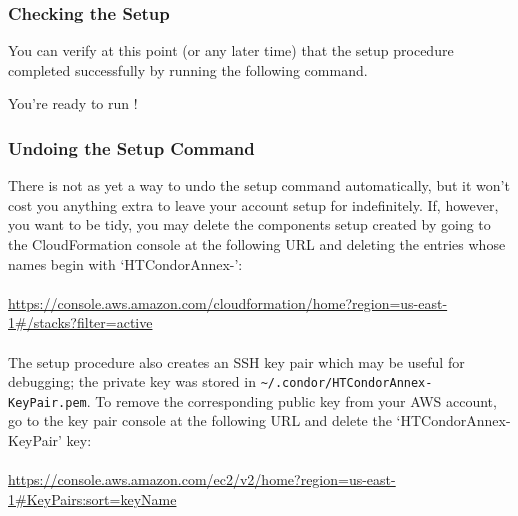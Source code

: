 \subsubsection{Checking the Setup}

You can verify at this point (or any later time) that the setup procedure
completed successfully by running the following command.


You're ready to run !

\subsubsection{Undoing the Setup Command}

There is not as yet a way to undo the setup command automatically, but it
won't cost you anything extra to leave your account setup for 
indefinitely.  If, however, you want to be tidy, you may delete the components
setup created by going to the CloudFormation console at the following URL
and deleting the entries whose names begin with `HTCondorAnnex-':\\
\\
\url{https://console.aws.amazon.com/cloudformation/home?region=us-east-1#/stacks?filter=active}\\
\\
The setup procedure also creates an SSH key pair which may be useful
for debugging; the private key was stored in
\texttt{\textasciitilde{}/.condor/HTCondorAnnex-KeyPair.pem}.  To remove the
corresponding public key from your AWS account, go to the key pair console
at the following URL and delete the `HTCondorAnnex-KeyPair' key:\\
\\
\url{https://console.aws.amazon.com/ec2/v2/home?region=us-east-1#KeyPairs:sort=keyName}
